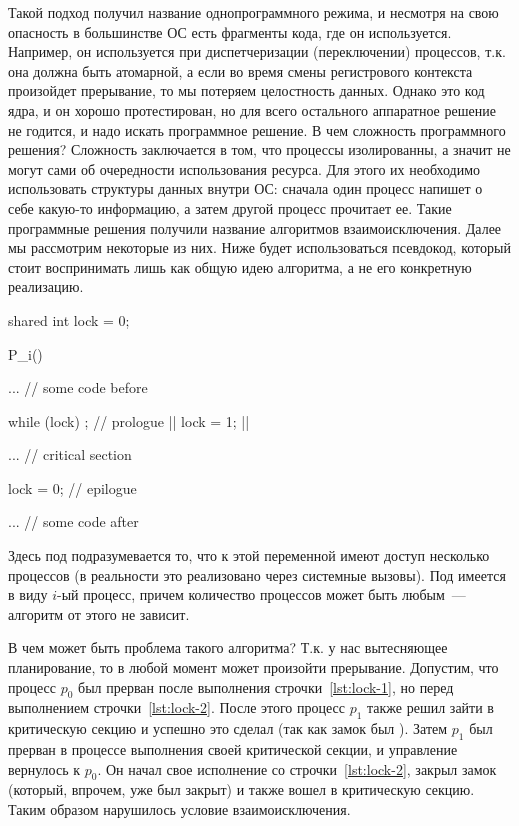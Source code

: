 Такой подход получил название однопрограммного режима, и несмотря на свою
опасность в большинстве ОС есть фрагменты кода, где он используется. Например,
он используется при диспетчеризации (переключении) процессов, т.к. она должна
быть атомарной, а если во время смены регистрового контекста произойдет
прерывание, то мы потеряем целостность данных. Однако это код ядра, и он хорошо
протестирован, но для всего остального аппаратное решение не годится, и надо
искать программное решение. В чем сложность программного решения? Сложность
заключается в том, что процессы изолированны, а значит не могут сами
 об очередности использования ресурса. Для этого их
необходимо использовать структуры данных внутри ОС: сначала один процесс напишет
о себе какую-то информацию, а затем другой процесс прочитает ее. Такие
программные решения получили название алгоритмов взаимоисключения. Далее мы
рассмотрим некоторые из них. Ниже будет использоваться псевдокод, который стоит
воспринимать лишь как общую идею алгоритма, а не его конкретную реализацию.


\begin{ccode}
  shared int lock = 0;

  P_i() {
    ... // some code before

    while (lock) {}; // prologue |\label{lst:lock-1}|
    lock = 1; |\label{lst:lock-2}|

    ... // critical section

    lock = 0; // epilogue

    ... // some code after
  }
\end{ccode}

Здесь под  подразумевается то, что к этой переменной имеют
доступ несколько процессов (в реальности это реализовано через системные
вызовы). Под  имеется в виду \(i\)-ый процесс, причем количество
процессов может быть любым~--- алгоритм от этого не зависит.

В чем может быть проблема такого алгоритма? Т.к. у нас вытесняющее планирование,
то в любой момент может произойти прерывание. Допустим, что процесс \(p_0\) был
прерван после выполнения строчки~\ref{lst:lock-1}, но перед выполнением
строчки~\ref{lst:lock-2}. После этого процесс \(p_1\) также решил зайти в
критическую секцию и успешно это сделал (так как замок был ).
Затем \(p_1\) был прерван в процессе выполнения своей критической секции, и
управление вернулось к \(p_0\). Он начал свое исполнение со
строчки~\ref{lst:lock-2}, закрыл замок (который, впрочем, уже был закрыт) и
также вошел в критическую секцию. Таким образом нарушилось условие
взаимоисключения.


